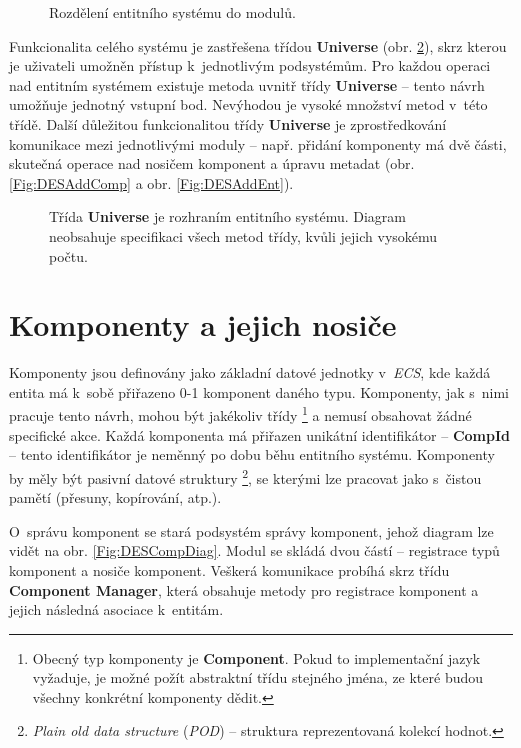 \begin{figure}[H]
	\caption{Rozdělení entitního systému do modulů.}
	\label{Fig:DESModules}
\end{figure}

Funkcionalita celého systému je zastřešena třídou \textbf{Universe} (obr. \ref{Fig:DESUniverse}), skrz kterou je uživateli umožněn přístup k~jednotlivým podsystémům. Pro každou operaci nad entitním systémem existuje metoda uvnitř třídy \textbf{Universe} -- tento návrh umožňuje jednotný vstupní bod. Nevýhodou je vysoké množství metod v~této třídě. Další důležitou funkcionalitou třídy \textbf{Universe} je zprostředkování komunikace mezi jednotlivými moduly -- např. přidání komponenty má dvě části, skutečná operace nad nosičem komponent a úpravu metadat (obr. \ref{Fig:DESAddComp} a obr. \ref{Fig:DESAddEnt}). 

\begin{figure}[H]
	\caption{Třída \textbf{Universe} je rozhraním entitního systému. Diagram neobsahuje specifikaci všech metod třídy, kvůli jejich vysokému počtu.}
	\label{Fig:DESUniverse}
\end{figure}

\section{Komponenty a jejich nosiče}

Komponenty jsou definovány jako základní datové jednotky v~\emph{ECS}, kde každá entita má k~sobě přiřazeno 0-1 komponent daného typu. Komponenty, jak s~nimi pracuje tento návrh, mohou být jakékoliv třídy \footnote{Obecný typ komponenty je \textbf{Component}. Pokud to implementační jazyk vyžaduje, je možné požít abstraktní třídu stejného jména, ze které budou všechny konkrétní komponenty dědit.} a nemusí obsahovat žádné specifické akce. Každá komponenta má přiřazen unikátní identifikátor -- \textbf{CompId} -- tento identifikátor je neměnný po dobu běhu entitního systému. Komponenty by měly být pasivní datové struktury \footnote{\emph{Plain old data structure} (\emph{POD}) -- struktura reprezentovaná kolekcí hodnot.}, se kterými lze pracovat jako s~čistou pamětí (přesuny, kopírování, atp.).

O~správu komponent se stará podsystém správy komponent, jehož diagram lze vidět na obr. \ref{Fig:DESCompDiag}. Modul se skládá dvou částí -- registrace typů komponent a nosiče komponent. Veškerá komunikace probíhá skrz třídu \textbf{Component Manager}, která obsahuje metody pro registrace komponent a jejich následná asociace k~entitám. 

